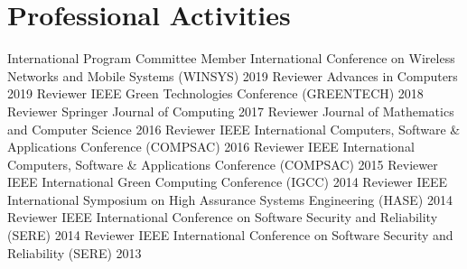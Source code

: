 \section{Professional Activities}
\begin{cvhonors}
  \cvhonor
    {International Program Committee Member}
    {International Conference on Wireless Networks and Mobile Systems (WINSYS)}
    {}
    {2019}
  \cvhonor
    {Reviewer}
    {Advances in Computers}
    {}
    {2019}
  \cvhonor
    {Reviewer}
    {IEEE Green Technologies Conference (GREENTECH)}
    {}
    {2018}
  \cvhonor
    {Reviewer}
    {Springer Journal of Computing}
    {}
    {2017}
  \cvhonor
    {Reviewer}
    {Journal of Mathematics and Computer Science}
    {}
    {2016}
  \cvhonor
    {Reviewer}
    {IEEE International Computers, Software \& Applications Conference (COMPSAC)}
    {}
    {2016}
  \cvhonor
    {Reviewer}
    {IEEE International Computers, Software \& Applications Conference (COMPSAC)}
    {}
    {2015}
  \cvhonor
    {Reviewer}
    {IEEE International Green Computing Conference (IGCC)}
    {}
    {2014}
  \cvhonor
    {Reviewer}
    {IEEE International Symposium on High Assurance Systems Engineering (HASE)}
    {}
    {2014}
  \cvhonor
    {Reviewer}
    {IEEE International Conference on Software Security and Reliability (SERE)}
    {}
    {2014}
  \cvhonor
    {Reviewer}
    {IEEE International Conference on Software Security and Reliability (SERE)}
    {}
    {2013}
\end{cvhonors} 